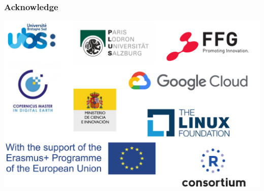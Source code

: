 \begin{frame}
	\frametitle{Acknowledge}
	\begin{center}
		\vspace{0.1cm}
		\includegraphics[scale=0.25]{images/acknowledge.pdf}
	\end{center}
\end{frame}